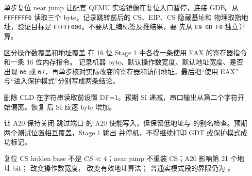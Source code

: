 
\begin{experimentbox}{单步复位 near jump}
让配套 QEMU 实验镜像在复位入口暂停，连接 GDB。从
\texttt{FFFFFFF0} 读取三个 byte，记录跳转前后的 CS、EIP、CS 隐藏基址和
物理取指地址，验证目标是 \texttt{FFFFF000}。不要从汇编标签反推结果，要
先从 \texttt{E9 0D F0} 独立计算。
\end{experimentbox}

\begin{experimentbox}{区分操作数覆盖和地址覆盖}
在 16 位 Stage 1 中各找一条使用 EAX 的寄存器指令和一条 16 位内存指令。
记录机器 byte、默认操作数宽度、默认地址宽度、是否出现 \texttt{66} 或
\texttt{67}，再单步核对实际改变的寄存器和访问地址。最后把“使用 EAX”
与“进入保护模式”分别写成两条结论。
\end{experimentbox}

\begin{faultinjectionbox}{删除 CLD}
在字符串读取前设置 DF=1。预期 SI 递减，串口输出从第二个字符开始偏离。恢复
 后 SI 应逐 byte 增加。
\end{faultinjectionbox}

\begin{faultinjectionbox}{让 A20 保持关闭}
跳过端口  的 A20 使能写入，但保留低地址与
 的别名检查。预期两个测试位置相互覆盖，Stage 1 输出
 并停机，不得继续打印 GDT 或保护模式成功标记。
\end{faultinjectionbox}

\begin{pitfallbox}
复位 CS hidden base 不是 \(CS\ll4\)；near jump 不重装 CS；A20 影响第 21
个地址 bit； 改变操作数宽度， 改变有效地址算法；
普通实模式段的界限仍为 。
\end{pitfallbox}

